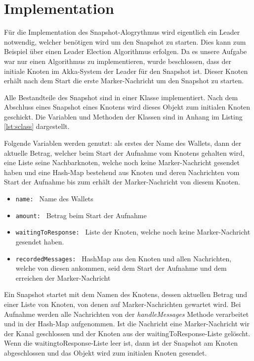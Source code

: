 \section{Implementation}
\label{sec:impl}
Für die Implementation des Snapshot-Alogrythmus wird eigentlich ein Leader 
notwendig, welcher benötigen wird um den Snapshot zu starten. Dies kann zum
Beispiel über einen Leader Election Algorithmus erfolgen. Da es unsere Aufgabe
war nur einen Algorithmus zu implementieren, wurde beschlossen, dass der 
initiale Knoten im Akka-System der Leader für den Snapshot ist. Dieser Knoten 
erhält nach dem Start die erste Marker-Nachricht um den Snapshot zu starten.

Alle Bestandteile des Snapshot sind in einer Klasse implementiert. Nach dem
Abschluss eines Snapshot eines Knotens wird dieses Objekt zum initialen Knoten
geschickt.
Die Variablen und Methoden der Klassen sind in Anhang im Listing \ref{lst:sclass} 
dargestellt.

Folgende Variablen werden genutzt: als erstes der Name des Wallets, dann
der aktuelle Betrag, welcher beim Start der Aufnahme vom Knotens gehalten wird,
eine Liste seine Nachbarknoten, welche noch keine Marker-Nachricht gesendet
haben und eine Hash-Map bestehend aus Knoten und deren Nachrichten vom Start
der Aufnahme bis zum erhält der Marker-Nachricht von diesem Knoten.

\begin{itemize}
 \item \texttt{name: } Name des Wallets
 \item \texttt{amount: } Betrag beim Start der Aufnahme
 \item \texttt{waitingToResponse: } Liste der Knoten, welche noch keine 
 Marker-Nachricht gesendet haben.
 \item \texttt{recordedMessages: } HashMap aus den Knoten und allen Nachrichten, 
 welche von diesen ankommen, seid dem Start der Aufnahme und dem erreichen der
 Marker-Nachricht
\end{itemize}

Ein Snapshot startet mit dem Namen des Knotens, dessen aktuellen Betrag und 
einer Liste von Knoten, von denen auf Marker-Nachrichten gewartet wird.
Bei Aufnahme werden alle Nachrichten von der \textit{handleMessages} Methode
verarbeitet und in der Hash-Map aufgenommen.
Ist die Nachricht eine Marker-Nachricht wir der Kanal geschlossen und der
Knoten aus der waitingToResponse-Liste gelöscht.
Wenn die waitingtoResponse-Liste leer ist, dann ist der Snapshot am Knoten
abgeschlossen und das Objekt wird zum initialen Knoten gesendet.

